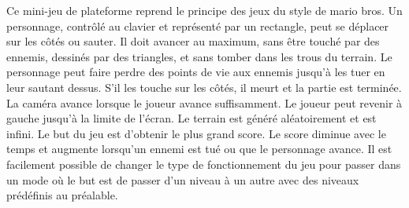 \begin{minipage}{9cm}
Ce mini-jeu de plateforme reprend le principe des jeux du style de mario bros.
Un personnage, contrôlé au clavier et représenté par un rectangle, peut se déplacer sur les côtés ou sauter.
Il doit avancer au maximum, sans être touché par des ennemis, dessinés par des triangles, et sans tomber dans les trous du terrain.
Le personnage peut faire perdre des points de vie aux ennemis jusqu'à les tuer en leur sautant dessus. 
S'il les touche sur les côtés, il meurt et la partie est terminée.
La caméra avance lorsque le joueur avance suffisamment. Le joueur peut revenir à gauche jusqu'à la limite de l'écran.
Le terrain est généré aléatoirement et est infini.
Le but du jeu est d'obtenir le plus grand score. Le score diminue avec le temps et augmente lorsqu'un ennemi est tué ou que le personnage avance.
Il est facilement possible de changer le type de fonctionnement du jeu pour passer dans un mode où le but est de passer d'un niveau à un autre
avec des niveaux prédéfinis au préalable.
\end{minipage}
\hfill
\begin{minipage}{6cm}
\end{minipage}


